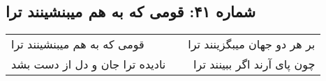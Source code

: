 \begin{center}
\section*{شماره ۴۱: قومی که به هم میبنشینند ترا}
\label{sec:041}
\begin{longtable}{l p{0.5cm} r}
قومی که به هم میبنشینند ترا
&&
بر هر دو جهان میبگزینند ترا
\\
نادیده ترا جان و دل از دست بشد
&&
چون پای آرند اگر ببینند ترا
\\
\end{longtable}
\end{center}
